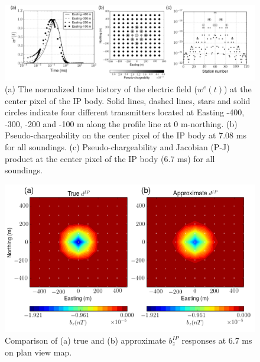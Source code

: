 \documentclass[a4paper, 11pt]{article}
\begin{document}
\begin{figure}[htb]
  \centering
  \includegraphics[width=1.\textwidth]{figures/Equivalent_peta.png}
  \caption{(a) The normalized time history of the electric field ($w^e(t)$) at the center pixel of the IP body. Solid lines, dashed lines, stars and solid circles indicate four different transmitters located at Easting -400, -300, -200 and -100 m  along the profile line at 0 m-northing.
  (b) Pseudo-chargeability on the center pixel of the IP body at 7.08 ms for all soundings.
  (c) Pseudo-chargeability and Jacobian (P-J) product at the center pixel of the IP body (6.7 ms) for all soundings.
  }
  \label{F:Equivalent_peta}
\end{figure}

\begin{figure}[htb]
  \centering
  \includegraphics[width=1.\textwidth]{figures/EquivPeta_True_Approx.png}
  \caption{Comparison of (a) true and (b) approximate $b_z^{IP}$ responses at 6.7 ms on plan view map.}
  \label{F:EquivPeta_True_Approx}
\end{figure}

\end{document}

